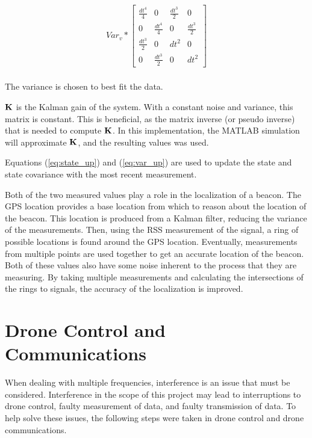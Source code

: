 \begin{align}
Var_v * \begin{bmatrix}\frac{dt^4}{4} & 0 & \frac{dt^3}{2} & 0\\0 & \frac{dt^4}{4} & 0 & \frac{dt^3}{2}\\\frac{dt^3}{2} & 0 & dt^2 & 0 \\ 0 & \frac{dt^3}{2} & 0 & dt^2  \end{bmatrix}
\end{align} \\
The variance is chosen to best fit the data. \par
$\mathbf{K}$ is the Kalman gain of the system. With a constant noise and variance, this matrix is constant. This is beneficial, as the matrix inverse (or pseudo inverse) that is needed to compute $\mathbf{K}$. In this implementation, the MATLAB simulation will approximate $\mathbf{K}$, and the resulting values was used. \par
Equations (\ref{eq:state_up}) and (\ref{eq:var_up}) are used to update the state and state covariance with the most recent measurement.\par

Both of the two measured values play a role in the localization of a beacon. The GPS location provides a base location from which to reason about the location of the beacon. This location is produced from a Kalman filter, reducing the variance of the measurements. Then, using the RSS measurement of the signal, a ring of possible locations is found around the GPS location. Eventually, measurements from multiple points are used together to get an accurate location of the beacon. Both of these values also have some noise inherent to the process that they are measuring. By taking multiple measurements and calculating the intersections of the rings to signals, the accuracy of the localization is improved.

\section{Drone Control and Communications}
When dealing with multiple frequencies, interference is an issue that must be considered. Interference in the scope of this project may lead to interruptions to drone control, faulty measurement of data, and faulty transmission of data. To help solve these issues, the following steps were taken in drone control and drone communications.\par 

